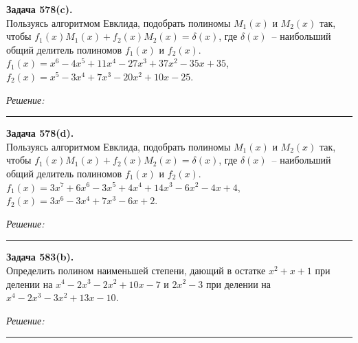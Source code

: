 \documentclass[a4paper, 12pt]{article}
\newenvironment{problem}[2][Задача]
    { \begin{mdframed}[backgroundcolor=gray!10] \textbf{#1 #2.} \\}
    {  \end{mdframed}}
\newenvironment{solution}
    {\textit{Решение: }}
    {\noindent\rule{7in}{1.5pt}}
\begin{document}
\begin{problem}{578(c)}
Пользуясь алгоритмом Евклида, подобрать полиномы $M_1(x)$ и $M_2(x)$ так,
чтобы $f_1(x)M_1(x)+f_2(x)M_2(x)=\delta(x)$, где $\delta(x)$~-- наибольший общий делитель полиномов $f_1(x)$ и $f_2(x)$.\\
$f_1(x)=x^6-4x^5+11x^4-27x^3+37x^2-35x+35$, \\ $f_2(x)=x^5-3x^4+7x^3-20x^2+10x-25$.
\end{problem}
\begin{solution}



\end{solution} 

\begin{problem}{578(d)}
Пользуясь алгоритмом Евклида, подобрать полиномы $M_1(x)$ и $M_2(x)$ так,
чтобы $f_1(x)M_1(x)+f_2(x)M_2(x)=\delta(x)$, где $\delta(x)$~-- наибольший общий делитель полиномов $f_1(x)$ и $f_2(x)$.\\
$f_1(x)=3x^7+6x^6-3x^5+4x^4+14x^3-6x^2-4x+4$, \\ $f_2(x)=3x^6-3x^4+7x^3-6x+2$.
\end{problem}
\begin{solution}



\end{solution} 

\begin{problem}{583(b)}
Определить полином наименьшей степени, дающий в остатке $x^2+x+1$ при делении на $x^4-2x^3-2x^2+10x-7$ и $2x^2-3$ при делении на $x^4-2x^3-3x^2+13x-10$.
\end{problem}
\begin{solution}



\end{solution} 


\end{document}
